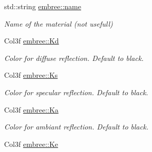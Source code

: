 \begin{DoxyCompactItemize}
\item 
\hypertarget{group___shading___type_ga671f271bb4c96ce4921a0208e5004c95}{
std::string \hyperlink{group___shading___type_ga671f271bb4c96ce4921a0208e5004c95}{embree::name}}
\label{group___shading___type_ga671f271bb4c96ce4921a0208e5004c95}

\begin{DoxyCompactList}\small\item\em Name of the material (not usefull) \item\end{DoxyCompactList}\item 
\hypertarget{group___shading___type_gadfe32b60657625fe3de0c7940cd6a6bb}{
Col3f \hyperlink{group___shading___type_gadfe32b60657625fe3de0c7940cd6a6bb}{embree::Kd}}
\label{group___shading___type_gadfe32b60657625fe3de0c7940cd6a6bb}

\begin{DoxyCompactList}\small\item\em Color for diffuse reflection. Default to black. \item\end{DoxyCompactList}\item 
\hypertarget{group___shading___type_ga4567746a933f09534eb0b6cb665566c2}{
Col3f \hyperlink{group___shading___type_ga4567746a933f09534eb0b6cb665566c2}{embree::Ks}}
\label{group___shading___type_ga4567746a933f09534eb0b6cb665566c2}

\begin{DoxyCompactList}\small\item\em Color for specular reflection. Default to black. \item\end{DoxyCompactList}\item 
\hypertarget{group___shading___type_ga983839cbde9b97df253d8ca53af73c0c}{
Col3f \hyperlink{group___shading___type_ga983839cbde9b97df253d8ca53af73c0c}{embree::Ka}}
\label{group___shading___type_ga983839cbde9b97df253d8ca53af73c0c}

\begin{DoxyCompactList}\small\item\em Color for ambiant reflection. Default to black. \item\end{DoxyCompactList}\item 
\hypertarget{group___shading___type_gaefa2b13c0bd18d2070e7a8b51ea7e027}{
Col3f \hyperlink{group___shading___type_gaefa2b13c0bd18d2070e7a8b51ea7e027}{embree::Ke}}
\label{group___shading___type_gaefa2b13c0bd18d2070e7a8b51ea7e027}


\end{DoxyCompactItemize}
